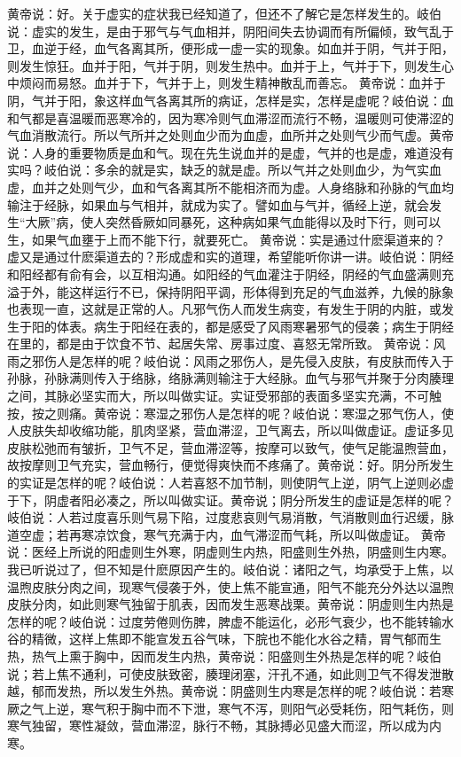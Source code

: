 \documentclass[a4paper,12pt,UTF8,twoside]{ctexbook}
\begin{document}
黄帝说：好。关于虚实的症状我已经知道了，但还不了解它是怎样发生的。岐伯说：虚实的发生，是由于邪气与气血相并，阴阳间失去协调而有所偏倾，致气乱于卫，血逆于经，血气各离其所，便形成一虚一实的现象。如血并于阴，气并于阳，则发生惊狂。血并于阳，气并于阴，则发生热中。血并于上，气并于下，则发生心中烦闷而易怒。血并于下，气并于上，则发生精神散乱而善忘。
黄帝说：血并于阴，气并于阳，象这样血气各离其所的病证，怎样是实，怎样是虚呢？岐伯说：血和气都是喜温暖而恶寒冷的，因为寒冷则气血滞涩而流行不畅，温暖则可使滞涩的气血消散流行。所以气所并之处则血少而为血虚，血所并之处则气少而气虚。黄帝说：人身的重要物质是血和气。现在先生说血并的是虚，气并的也是虚，难道没有实吗？岐伯说：多余的就是实，缺乏的就是虚。所以气并之处则血少，为气实血虚，血并之处则气少，血和气各离其所不能相济而为虚。人身络脉和孙脉的气血均输注于经脉，如果血与气相并，就成为实了。譬如血与气并，循经上逆，就会发生“大厥”病，使人突然昏厥如同暴死，这种病如果气血能得以及时下行，则可以生，如果气血壅于上而不能下行，就要死亡。
黄帝说：实是通过什麽渠道来的？虚又是通过什麽渠道去的？形成虚和实的道理，希望能听你讲一讲。岐伯说：阴经和阳经都有俞有会，以互相沟通。如阳经的气血灌注于阴经，阴经的气血盛满则充溢于外，能这样运行不已，保持阴阳平调，形体得到充足的气血滋养，九候的脉象也表现一直，这就是正常的人。凡邪气伤人而发生病变，有发生于阴的内脏，或发生于阳的体表。病生于阳经在表的，都是感受了风雨寒暑邪气的侵袭；病生于阴经在里的，都是由于饮食不节、起居失常、房事过度、喜怒无常所致。
黄帝说：风雨之邪伤人是怎样的呢？岐伯说：风雨之邪伤人，是先侵入皮肤，有皮肤而传入于孙脉，孙脉满则传入于络脉，络脉满则输注于大经脉。血气与邪气并聚于分肉腠理之间，其脉必坚实而大，所以叫做实证。实证受邪部的表面多坚实充满，不可触按，按之则痛。黄帝说：寒湿之邪伤人是怎样的呢？岐伯说：寒湿之邪气伤人，使人皮肤失却收缩功能，肌肉坚紧，营血滞涩，卫气离去，所以叫做虚证。虚证多见皮肤松弛而有皱折，卫气不足，营血滞涩等，按摩可以致气，使气足能温煦营血，故按摩则卫气充实，营血畅行，便觉得爽快而不疼痛了。黄帝说：好。阴分所发生的实证是怎样的呢？岐伯说：人若喜怒不加节制，则使阴气上逆，阴气上逆则必虚于下，阴虚者阳必凑之，所以叫做实证。黄帝说；阴分所发生的虚证是怎样的呢？岐伯说：人若过度喜乐则气易下陷，过度悲哀则气易消散，气消散则血行迟缓，脉道空虚；若再寒凉饮食，寒气充满于内，血气滞涩而气耗，所以叫做虚证。
黄帝说：医经上所说的阳虚则生外寒，阴虚则生内热，阳盛则生外热，阴盛则生内寒。我已听说过了，但不知是什麽原因产生的。岐伯说：诸阳之气，均承受于上焦，以温煦皮肤分肉之间，现寒气侵袭于外，使上焦不能宣通，阳气不能充分外达以温煦皮肤分肉，如此则寒气独留于肌表，因而发生恶寒战栗。黄帝说：阴虚则生内热是怎样的呢？岐伯说：过度劳倦则伤脾，脾虚不能运化，必形气衰少，也不能转输水谷的精微，这样上焦即不能宣发五谷气味，下脘也不能化水谷之精，胃气郁而生热，热气上熏于胸中，因而发生内热，黄帝说：阳盛则生外热是怎样的呢？岐伯说；若上焦不通利，可使皮肤致密，腠理闭塞，汗孔不通，如此则卫气不得发泄散越，郁而发热，所以发生外热。黄帝说：阴盛则生内寒是怎样的呢？岐伯说：若寒厥之气上逆，寒气积于胸中而不下泄，寒气不泻，则阳气必受耗伤，阳气耗伤，则寒气独留，寒性凝敛，营血滞涩，脉行不畅，其脉搏必见盛大而涩，所以成为内寒。
\end{document}
